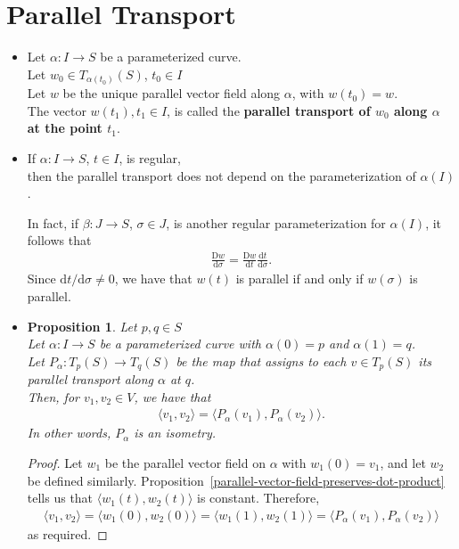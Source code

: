 \documentclass[10pt]{article}
\newtheorem{proposition}[lemma]{Proposition}
\newcommand{\dee}{\mathrm{d}}
\newcommand{\Dee}{\mathrm{D}}
\newcommand{\ra}{\rightarrow}
\begin{document}
  \section{Parallel Transport}

  \begin{itemize}
    \item Let $\alpha : I \ra S$ be a parameterized curve.\\
    Let $w_0 \in T_{\alpha(t_0)}(S)$, $t_0 \in I$\\
    Let $w$ be the unique parallel vector field along $\alpha$, with $w(t_0) = w$.\\
    The vector $w(t_1), t_1 \in I$, is called the {\bf parallel transport of $w_0$ along $\alpha$ at the point $t_1$}.

    \item If $\alpha : I \ra S$, $t \in I$, is regular,\\
    then the parallel transport does not depend on the parameterization of $\alpha(I)$.

    In fact, if $\beta : J \ra S$, $\sigma \in J$, is another regular parameterization for $\alpha(I)$, it follows that
    \begin{align*}
      \frac{\Dee w}{\dee \sigma} = \frac{\Dee w}{\dee t} \frac{\dee t}{\dee \sigma}.
    \end{align*}
    Since $\dee t / \dee \sigma \neq 0$, we have that $w(t)$ is parallel if and only if $w(\sigma)$ is parallel.

    \item \begin{proposition}
      Let $p, q \in S$\\
      Let $\alpha: I \ra S$ be a parameterized curve with $\alpha(0) = p$ and $\alpha(1) = q$.\\
      Let $P_\alpha: T_p(S) \ra T_q(S)$ be the map that assigns to each $v \in T_p(S)$ its parallel transport along $\alpha$ at $q$.\\
      Then, for $v_1, v_2 \in V$, we have that
      \begin{align*}
        \langle v_1, v_2 \rangle = \langle P_\alpha(v_1), P_\alpha(v_2) \rangle.
      \end{align*}
      In other words, $P_\alpha$ is an isometry.
    \end{proposition}
    \begin{proof}
      Let $w_1$ be the parallel vector field on $\alpha$ with $w_1(0) = v_1$, and let $w_2$ be defined similarly. Proposition~\ref{parallel-vector-field-preserves-dot-product} tells us that $\langle w_1(t), w_2(t) \rangle$ is constant. Therefore,
      \begin{align*}
        \langle v_1, v_2 \rangle = \langle w_1(0), w_2(0) \rangle = \langle w_1(1), w_2(1) \rangle = \langle P_\alpha(v_1), P_\alpha(v_2) \rangle
      \end{align*}
      as required.
    \end{proof}


\end{itemize}
\end{document}
